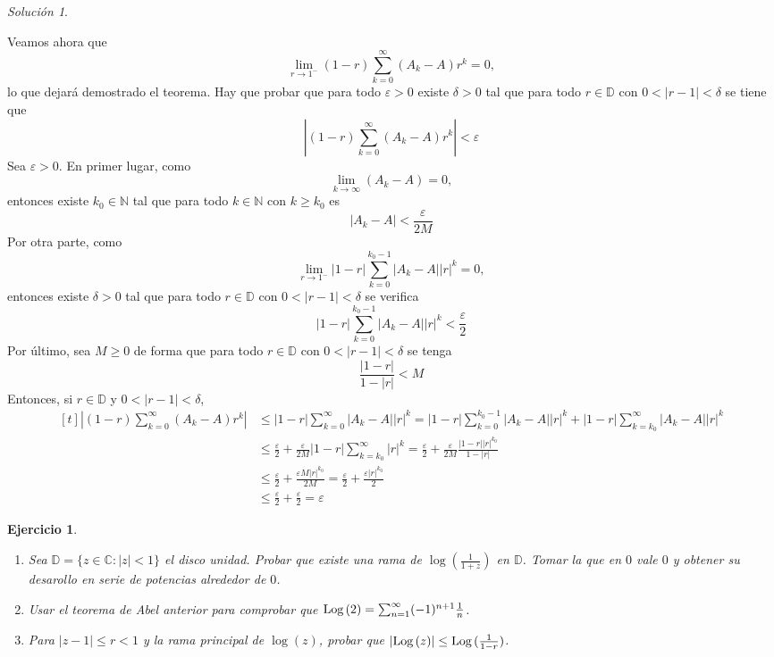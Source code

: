 \documentclass[11pt]{report}
\newcommand{\N}{\mathbb N}
\newcommand{\C}{\mathbb C}
\newcommand{\D}{\mathbb D}
\newtheorem{exercise}{Ejercicio}
\theoremstyle{remark}
\newtheorem*{resolution}{Solución}
\begin{document}
\begin{resolution}
\begin{enumerate}
    Veamos ahora que
    \[\lim_{r \to 1^-}(1-r)\sum_{k=0}^\infty (A_k-A)r^k = 0,\]
    lo que dejará demostrado el teorema. Hay que probar que para todo $\varepsilon >0$ existe $\delta >0$ tal que para todo $r \in \D$ con $0<|r-1|<\delta$ se tiene que 
    \[\left|(1-r)\sum_{k=0}^\infty (A_k-A)r^k\right|<\varepsilon\]
    Sea $\varepsilon >0$. En primer lugar, como
    \[\lim_{k \to \infty} (A_k-A) = 0,\]
    entonces existe $k_0\in \N$ tal que para todo $k \in \N$ con $k \geq k_0$ es
    \[|A_k-A| < \frac{\varepsilon}{2M}\]
    Por otra parte, como
    \[\lim_{r \to 1^-} |1-r|\sum_{k=0}^{k_0-1} |A_k-A||r|^k = 0,\]
    entonces existe $\delta >0$ tal que para todo $r \in \D$ con $0<|r-1|<\delta$ se verifica
    \[|1-r|\sum_{k=0}^{k_0-1} |A_k-A||r|^k < \frac{\varepsilon}{2}\]
    Por último, sea $M \geq 0$ de forma que para todo $r \in \D$ con $0<|r-1|<\delta$ se tenga
    \[\frac{|1-r|}{1-|r|} < M\]
    Entonces, si $r \in \D$ y $0 < |r-1|<\delta$,
    \[
    \begin{aligned}[t]
    \left|(1-r)\sum_{k=0}^\infty (A_k-A)r^k\right|
    &\leq |1-r|\sum_{k=0}^\infty |A_k-A||r|^k = |1-r|\sum_{k=0}^{k_0-1} |A_k-A||r|^k+|1-r|\sum_{k=k_0}^{\infty} |A_k-A||r|^k \\
    &\leq \frac{\varepsilon}{2}+\frac{\varepsilon}{2M}|1-r|\sum_{k=k_0}^\infty |r|^k = \frac{\varepsilon}{2}+\frac{\varepsilon}{2M}\frac{|1-r||r|^{k_0}}{1-|r|} \\
    &\leq  \frac{\varepsilon}{2}+\frac{\varepsilon M|r|^{k_0}}{2M} = \frac{\varepsilon}{2}+\frac{\varepsilon |r|^{k_0}}{2}\\
    &\leq \frac{\varepsilon}{2}+\frac{\varepsilon}{2} = \varepsilon
    \end{aligned}
    \]
\end{enumerate}
\end{resolution}

\begin{exercise}
\hfill
\begin{enumerate}
    \item Sea $\D = \{z \in \C \colon |z| < 1\}$ el disco unidad. Probar que existe una rama de $\log(\frac{1}{1+z})$ en $\D$. Tomar la que en $0$ vale $0$ y obtener su desarollo en serie de potencias alrededor de $0$.
    \item Usar el teorema de Abel anterior para comprobar que $\textup{Log}\,(2) = \sum_{n=1}^\infty(-1)^{n+1}\frac{1}{n}$.
    \item Para $|z-1| \leq r<1$ y la rama principal de $\log(z)$, probar que $|\textup{Log}\,(z)| \leq \textup{Log}\,(\frac{1}{1-r})$.
\end{enumerate}
\end{exercise}
\end{document}

